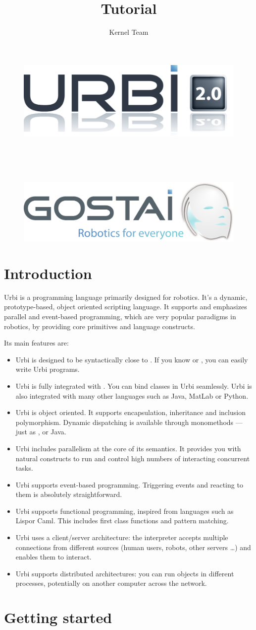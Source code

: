 \documentclass[openright,twoside,12pt]{report}
\title{Tutorial}
\author{Kernel Team}
\makeatletter
\newcommand{\caml}{Caml\xspace}
\newcommand{\java}{Java\xspace}
\newcommand{\lisp}{Lisp}
\newcommand{\matlab}{MatLab\xspace}
\newcommand{\python}{Python\xspace}
\newcommand{\urbi}{Urbi\xspace}
\renewcommand{\maketitle}{
  \begin{titlepage}

    \vfill

    \begin{figure}[htp]
      \centering
      \includegraphics[width=12cm]{urbi-logo}
    \end{figure}

    \begin{center}
      {\Huge\bf\@title\\}
      \vspace{1cm}
      {\Large \@author\\}
      \vspace{1cm}
      {\large \@date\\}
    \end{center}

    \vfill

    \begin{figure}[htp]
      \centering
      \includegraphics[width=12cm]{gostai}
    \end{figure}

    \vfill
    \global\let\title\relax
  \end{titlepage}
}
\makeatother
\begin{document}
\maketitle

\chapter{Introduction}

Urbi is a programming language primarily designed for robotics. It's a
dynamic, prototype-based, object oriented scripting language. It
supports and emphasizes parallel and event-based programming, which
are very popular paradigms in robotics, by providing core primitives
and language constructs.

Its main features are:
\begin{itemize}
\item \urbi is designed to be syntactically close to \Cxx. If you know
  \C or \Cxx, you can easily write \urbi programs.
\item \urbi is fully integrated with \Cxx. You can bind \Cxx classes
  in \urbi seamlessly. \urbi is also integrated with many other
  languages such as \java, \matlab or \python.
\item \urbi is object oriented. It supports encapsulation, inheritance
  and inclusion polymorphism. Dynamic dispatching is available through
  monomethods --- just as \Cxx, \Cs or \java.
\item \urbi includes parallelism at the core of its semantics. It
  provides you with natural constructs to run and control high numbers
  of interacting concurrent tasks.
\item \urbi supports event-based programming. Triggering events and
  reacting to them is absolutely straightforward.
\item \urbi supports functional programming, inspired from languages
  such as \lisp or \caml. This includes first class functions and
  pattern matching.
\item \urbi uses a client/server architecture: the interpreter accepts
  multiple connections from different sources (human users, robots,
  other servers \ldots) and enables them to interact.
\item \urbi supports distributed architectures: you can run objects in
  different processes, potentially on another computer across the
  network.
\end{itemize}

\chapter{Getting started}
\end{document}
